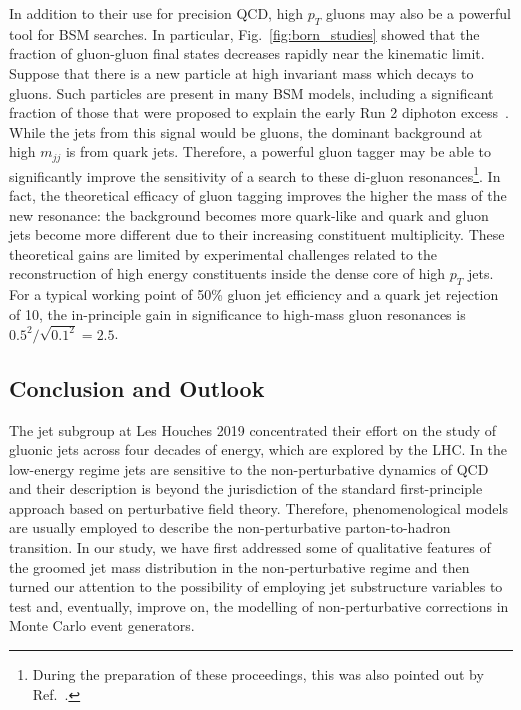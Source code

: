 \documentclass[11pt]{cernrep}
\begin{document}
In addition to their use for precision QCD, high $p_T$ gluons may also be a powerful tool for BSM searches.  In particular, Fig.~\ref{fig:born_studies} showed that the fraction of gluon-gluon final states decreases rapidly near the kinematic limit.  Suppose that there is a new particle at high invariant mass which decays to gluons.  Such particles are present in many BSM models, including a significant fraction of those that were proposed to explain the early Run 2 diphoton excess~\cite{Khachatryan:2016hje,Aaboud:2016tru}.  While the jets from this signal would be gluons, the dominant background at high $m_{jj}$ is from quark jets.  Therefore, a powerful gluon tagger may be able to significantly improve the sensitivity of a search to these di-gluon resonances\footnote{During the preparation of these proceedings, this was also pointed out by Ref.~\cite{Nayak:2019quy}.}.  In fact, the theoretical efficacy of gluon tagging improves the higher the mass of the new resonance: the background becomes more quark-like and quark and gluon jets become more different due to their increasing constituent multiplicity.  These theoretical gains are limited by experimental challenges related to the reconstruction of high energy constituents inside the dense core of high $p_T$ jets.  For a typical working point of 50\% gluon jet efficiency and a quark jet rejection of 10, the in-principle gain in significance to high-mass gluon resonances is $0.5^2/\sqrt{0.1^2}=2.5$.

\subsection{Conclusion and Outlook}
\label{sec:jets:conclusion}
The jet subgroup at Les Houches 2019 concentrated their effort on the study of gluonic jets across four decades of energy, which are explored by the LHC. 
%
In the low-energy regime jets are sensitive to the non-perturbative dynamics of QCD and their description is beyond the jurisdiction of the standard first-principle approach based on perturbative field theory. Therefore, phenomenological models are usually employed to describe the non-perturbative parton-to-hadron transition. 
%
In our study, we have first addressed some of qualitative features of the groomed jet mass distribution in the non-perturbative regime and then turned our attention to the possibility of employing jet substructure variables to test and, eventually, improve on, the modelling of non-perturbative corrections in Monte Carlo event generators. 
\end{document}
